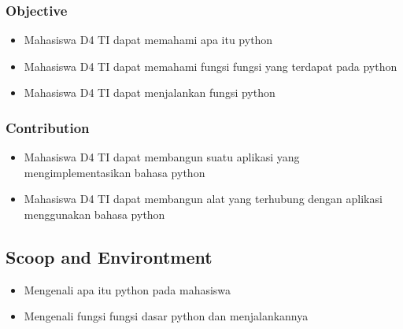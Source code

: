 \subsubsection{Objective}
\begin{itemize}
	\item Mahasiswa D4 TI dapat memahami apa itu python
	\item Mahasiswa D4 TI dapat memahami fungsi fungsi yang terdapat pada python
	\item Mahasiswa D4 TI dapat menjalankan fungsi python
\end{itemize}
	
\subsubsection{Contribution}
\begin{itemize}
	\item Mahasiswa D4 TI dapat membangun suatu aplikasi yang mengimplementasikan bahasa python
	\item Mahasiswa D4 TI dapat membangun alat yang terhubung dengan aplikasi menggunakan bahasa python
\end{itemize}

\subsection{Scoop and Environtment}
\begin{itemize}
	\item Mengenali apa itu python pada mahasiswa
	\item Mengenali fungsi fungsi dasar python dan menjalankannya
\end{itemize}
